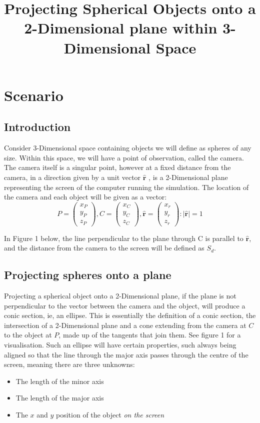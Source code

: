 \documentclass{article}
\title{Projecting Spherical Objects onto a 2-Dimensional plane within 3-Dimensional Space}
\date{}
\newcommand\dd{{2-Dimensional}\xspace}
\newcommand\ddd{{3-Dimensional}\xspace}
\newcommand\ru{\hat{\mathbf{r}}\xspace}
\begin{document}
\maketitle
\tableofcontents
\section{Scenario}

	\subsection{Introduction}
	Consider \ddd space containing objects we will define as spheres of any size. Within this space, we will have a point of 
	observation, called the camera. The camera itself is a singular point, however at a fixed distance from the camera, in a direction given by a
	unit vector $\ru$ , is a \dd plane 
	representing the screen of the computer running the simulation. The location of the camera and each object will be given as a vector:
	$$P = \begin{pmatrix}x_P\\y_P\\z_P\end{pmatrix}, C = \begin{pmatrix}x_C\\y_C\\z_C\end{pmatrix}, \hat{\mathbf{r}} = \begin{pmatrix}x_r\\y_r\\z_r\end{pmatrix}:|\ru|=1$$
	

	In Figure 1 below, the line perpendicular to the plane through C is parallel to $\ru$, and the distance from the camera to the screen will be
	defined as $S_d$.
	\subsection{Projecting spheres onto a plane}
	Projecting a spherical object onto a \dd plane, if the plane is not perpendicular to the vector between the camera and the object, 
	will produce a conic section, ie, an ellipse. This is essentially the definition of a conic section, the intersection of a \dd plane and a cone 
	extending from the camera at $C$ to the object at $P$, made up of the tangents that join them. See figure 1 for a visualisation.
	Such an ellipse will have certain properties, such always being aligned so that the line through the major axis passes through the centre of 
	the screen, meaning there are three unknowns:
	\begin{itemize}
		\item The length of the minor axis
		\item The length of the major axis
		\item The $x$ and $y$ position of the object \textit{on the screen}
	\end{itemize}
	
\end{document}
